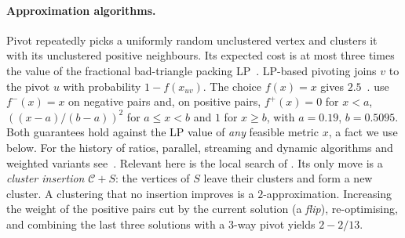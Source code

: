 \documentclass[11pt]{article}
\theoremstyle{definition}
\begin{document}
\paragraph{Approximation algorithms.}  Pivot repeatedly picks a uniformly
random unclustered vertex and clusters it with its unclustered positive
neighbours.  Its expected cost is at most three times the value of the
fractional bad-triangle packing LP~\citep{AilonCN08}.  LP-based pivoting joins
$v$ to the pivot $u$ with probability $1-f(x_{uv})$.  The choice $f(x)=x$
gives $2.5$~\citep{AilonCN08}.  \citet{ChawlaMSY15} use $f^-(x)=x$ on negative
pairs and, on positive pairs, $f^+(x)=0$ for $x<a$,
$((x-a)/(b-a))^2$ for $a\le x<b$ and $1$ for $x\ge b$, with
$a=0.19$, $b=0.5095$.  Both guarantees hold against the LP value of \emph{any}
feasible metric $x$, a fact we use below.  For the history of ratios,
parallel, streaming and dynamic algorithms and weighted variants
see~\citep{CohenAddadLPTYZ24,CaoCLLLNTVYZ25,GarciaSorianoS26,
cohenaddad2021constant,behnezhad2022almost3,DemaineEFI06}.  Relevant here is
the local search of \citet{CohenAddadLPTYZ24}.  Its only move is a
\emph{cluster insertion} $\mathcal C+S$: the vertices of $S$ leave their
clusters and form a new cluster.  A clustering that no insertion improves is a
$2$-approximation.  Increasing the weight of the positive pairs cut by the
current solution (a \emph{flip}), re-optimising, and combining the last three
solutions with a $3$-way pivot yields $2-2/13$.
\end{document}
